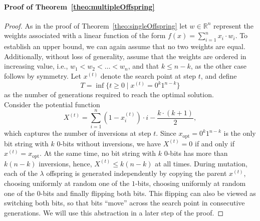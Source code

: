 \vspace{3mm}
\paragraph{Proof of Theorem~\ref{theo:multipleOffspring}}

\begin{proof}
    As in the proof of Theorem~\ref{theo:singleOffspring} let $ w \in \mathbb{R}^n $ represent the weights associated with a linear function of the form $ f(x) = \sum_{i=1}^n x_i \cdot w_i $. To establish an upper bound, we can again assume that no two weights are equal. Additionally, without loss of generality, assume that the weights are ordered in increasing value, i.e., $ w_1 < w_2 < \dots < w_n $, and that $ k \leq n - k $, as the other case follows by symmetry. Let $ x^{(t)} $ denote the search point at step $ t $, and define 
    \begin{displaymath}
    T = \inf\{ t \geq 0 \mid x^{(t)} = 0^{k}1^{n-k} \}
    \end{displaymath}
    as the number of generations required to reach the optimal solution. \\
    Consider the potential function 
    \begin{displaymath}
    X^{(t)} = \sum_{i=1}^n (1-x^{(t)}_i) \cdot i - \frac{k \cdot (k+1)}{2},
    \end{displaymath} which captures the number of inversions at step $t$. Since $x_{\text{opt}} = 0^k 1^{n-k}$ is the only bit string with $k$ $0$-bits without inversions, we have $X^{(t)} = 0$ if and only if $x^{(t)}=x_{\text{opt}}$. At the same time, no bit string with $k$ $0$-bits has more than $k(n-k)$ inversions, hence, $X^{(t)} \le k(n-k)$ at all times. 
    During mutation, each of the $\lambda$ offspring is generated independently by copying the parent $x^{(t)}$, choosing uniformly at random one of the $1$-bits, choosing uniformly at random one of the $0$-bits and finally flipping both bits. This flipping can also be viewed as switching both bits, so that bits ``move'' across the search point in consecutive generations. We will use this abstraction in a later step of the proof. 
    

\end{proof}
